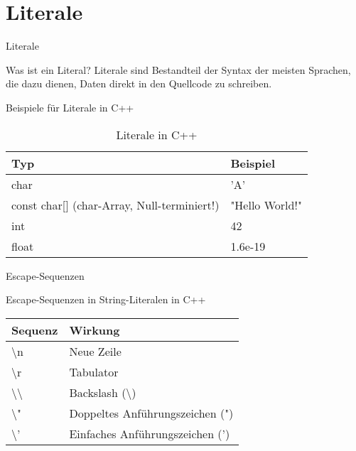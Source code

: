\section{Literale}
\begin{frame}{Literale}
    \begin{block}{Was ist ein Literal?}
    Literale sind Bestandteil der Syntax der meisten Sprachen, die dazu dienen, Daten direkt in den Quellcode zu schreiben.
    \end{block}
    \pause
    \begin{block}{Beispiele für Literale in C++}
    \begin{table}
    \center
    \begin{tabular}{ll}
        \toprule
        Typ & Beispiel \\
        \midrule
        char & 'A' \\
        const char[] (char-Array, Null-terminiert!) & "Hello World!" \\
        int & 42 \\
        float & 1.6e-19 \\
        \bottomrule
    \end{tabular}
    \caption{Literale in C++}
    \end{table}
    \end{block}
\end{frame}

\begin{frame}{Escape-Sequenzen}
    \begin{block}{Escape-Sequenzen in String-Literalen in C++}
    \begin{table}
    \center
    \begin{tabular}{ll}
        \toprule
        Sequenz & Wirkung \\
        \midrule
        \textbackslash n & Neue Zeile \\
        \textbackslash r & Tabulator \\
        \textbackslash\textbackslash & Backslash (\textbackslash) \\
        \textbackslash" & Doppeltes Anführungszeichen (") \\
        \textbackslash' & Einfaches Anführungszeichen (') \\
        \bottomrule
    \end{tabular}
    \end{table}
    \end{block}
\end{frame}

